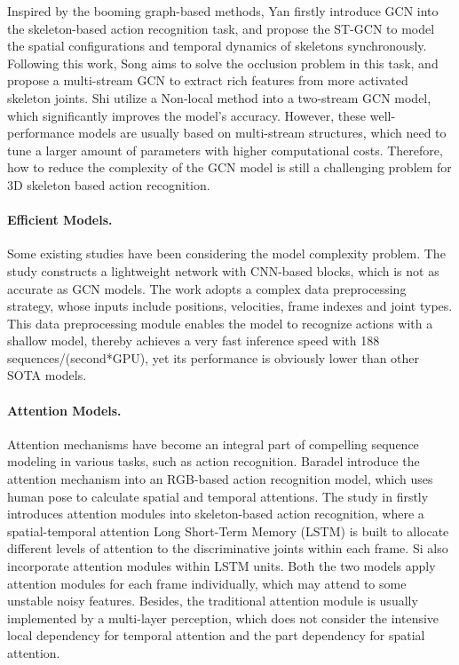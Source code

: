 \documentclass[sigconf]{acmart}
\begin{document}
Inspired by the booming graph-based methods, Yan \etal \cite{yan2018spatial} firstly introduce GCN into the skeleton-based action recognition task, and propose the ST-GCN to model the spatial configurations and temporal dynamics of skeletons synchronously. Following this work, Song \etal \cite{song2019richly} aims to solve the occlusion problem in this task, and propose a multi-stream GCN to extract rich features from more activated skeleton joints. Shi \etal \cite{shi2019two} utilize a Non-local method into a two-stream GCN model, which significantly improves the model's accuracy. However, these well-performance models are usually based on multi-stream structures, which need to tune a larger amount of parameters with higher computational costs. Therefore, how to reduce the complexity of the GCN model is still a challenging problem for 3D skeleton based action recognition.

\paragraph{Efficient Models.} Some existing studies have been considering the model complexity problem. The study \cite{yang2019make} constructs a lightweight network with CNN-based blocks, which is not as accurate as GCN models. The work \cite{zhang2019semantics} adopts a complex data preprocessing strategy, whose inputs include positions, velocities, frame indexes and joint types. This data preprocessing module enables the model to recognize actions with a shallow model, thereby achieves a very fast inference speed with 188 sequences/(second*GPU), yet its performance is obviously lower than other SOTA models.

\paragraph{Attention Models.} Attention mechanisms have become an integral part of compelling sequence modeling in various tasks, such as action recognition. Baradel \etal \cite{baradel2017human} introduce the attention mechanism into an RGB-based action recognition model, which uses human pose to calculate spatial and temporal attentions. The study in \cite{song2017end} firstly introduces attention modules into skeleton-based action recognition, where a spatial-temporal attention Long Short-Term Memory (LSTM) is built to allocate different levels of attention to the discriminative joints within each frame. Si \etal \cite{si2019attention} also incorporate attention modules within LSTM units. Both the two models apply attention modules for each frame individually, which may attend to some unstable noisy features. Besides, the traditional attention module is usually implemented by a multi-layer perception, which does not consider the intensive local dependency for temporal attention and the part dependency for spatial attention.
\end{document}
